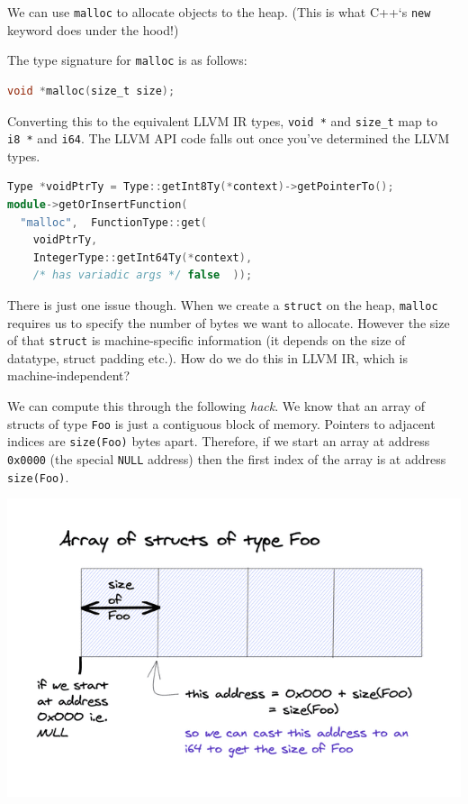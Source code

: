 We can use \texttt{malloc} to allocate objects to the heap. (This is
what C++`s \texttt{new} keyword does under the hood!)

The type signature for \texttt{malloc} is as follows:


\begin{lstlisting}[language=C]
void *malloc(size_t size);
\end{lstlisting}

Converting this to the equivalent LLVM IR types, \texttt{void\ *} and
\texttt{size\_t} map to \texttt{i8\ *} and \texttt{i64}. The LLVM API
code falls out once you've determined the LLVM types.

%

\begin{lstlisting}[caption={extern\_functions\_codegen.cc},language=C++]
Type *voidPtrTy = Type::getInt8Ty(*context)->getPointerTo();
module->getOrInsertFunction(
  "malloc",  FunctionType::get(
    voidPtrTy,
    IntegerType::getInt64Ty(*context),
    /* has variadic args */ false  ));
\end{lstlisting}

There is just one issue though. When we create a \texttt{struct} on the
heap, \texttt{malloc} requires us to specify the number of bytes we want
to allocate. However the size of that \texttt{struct} is
machine-specific information (it depends on the size of datatype, struct
padding etc.). How do we do this in LLVM IR, which is
machine-independent?

We can compute this through the following \emph{hack}. We know that an
array of structs of type \texttt{Foo} is just a contiguous block of
memory. Pointers to adjacent indices are \texttt{size(Foo)} bytes apart.
Therefore, if we start an array at address \texttt{0x0000} (the special
\texttt{NULL} address) then the first index of the array is at address
\texttt{size(Foo)}.

{
\href{https://mukulrathi.com/static/3ffd7d3a6019e3375f7834e25b4853f8/95fa1/malloc-size.png}{{}
\includegraphics[width=\linewidth]{09_files/malloc-size.png}} }

